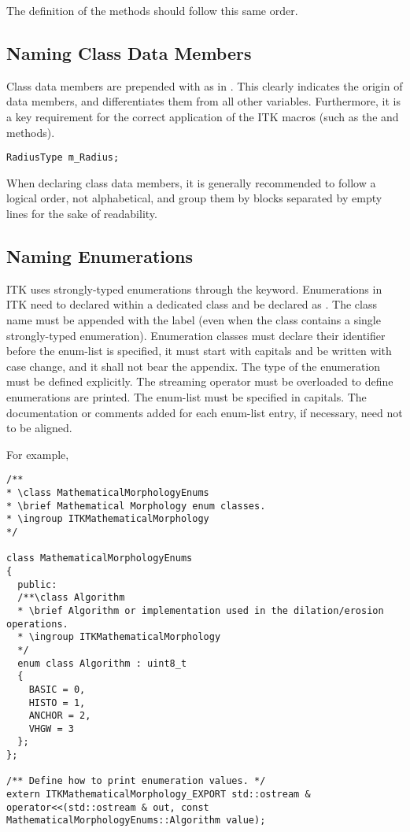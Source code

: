 The definition of the methods should follow this same order.


\subsection{Naming Class Data Members}
\label{NamingClassDataMembers}

Class data members are prepended with  as in . This
clearly indicates the origin of data members, and differentiates them from all
other variables. Furthermore, it is a key requirement for the correct
application of the ITK macros (such as the  and
 methods).
\small
\begin{verbatim}
RadiusType m_Radius;
\end{verbatim}
\normalsize

When declaring class data members, it is generally recommended to follow a
logical order, not alphabetical, and group them by blocks separated by empty
lines for the sake of readability.


\subsection{Naming Enumerations}
\label{subsec:NamingEnums}

ITK uses strongly-typed enumerations through the  keyword.
Enumerations in ITK need to declared within a dedicated class and be declared
as . The class name must be appended with the  label
(even when the class contains a single strongly-typed enumeration). Enumeration
classes must declare their identifier before the enum-list is specified, it
must start with capitals and be written with case change, and it shall not bear
the  appendix. The type of the enumeration must be defined
explicitly. The streaming operator \code{<<} must be overloaded to define
enumerations are printed. The enum-list must be specified in capitals. The
documentation or comments added for each enum-list entry, if necessary, need
not to be aligned.

For example,
\small
\begin{verbatim}
/**
* \class MathematicalMorphologyEnums
* \brief Mathematical Morphology enum classes.
* \ingroup ITKMathematicalMorphology
*/

class MathematicalMorphologyEnums
{
  public:
  /**\class Algorithm
  * \brief Algorithm or implementation used in the dilation/erosion operations.
  * \ingroup ITKMathematicalMorphology
  */
  enum class Algorithm : uint8_t
  {
    BASIC = 0,
    HISTO = 1,
    ANCHOR = 2,
    VHGW = 3
  };
};

/** Define how to print enumeration values. */
extern ITKMathematicalMorphology_EXPORT std::ostream &
operator<<(std::ostream & out, const MathematicalMorphologyEnums::Algorithm value);
\end{verbatim}
\normalsize

